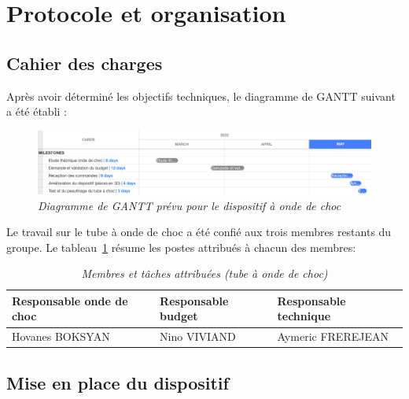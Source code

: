 \section{Protocole et organisation}
\subsection{Cahier des charges}
Après avoir déterminé les objectifs techniques, le diagramme de GANTT suivant a été établi :
\begin{figure}[H]
	\centering
	\includegraphics[scale = 0.4]{figures/gantt_choc.png}
	\caption{\small{\textit{Diagramme de GANTT prévu pour le dispositif à onde de choc}}}
	\label{fig:gantt_choc}
\end{figure}
Le travail sur le tube à onde de choc a été confié aux trois membres restants du groupe. Le tableau~\ref{tab:gestion_choc} résume les postes attribués à chacun des membres:
\begin{table}[H]
	\centering
	\begin{tabular}{|l l l|}
		\hline
		\small\textbf{Responsable onde de choc}&\small\textbf{Responsable budget}&\small\textbf{Responsable technique}\\
		\hline
		\small{Hovanes BOKSYAN}&\small{Nino VIVIAND}&\small{Aymeric FREREJEAN}\\
		\hline
	\end{tabular}
	\caption{\small\textit{Membres et tâches attribuées (tube à onde de choc)}}
	\label{tab:gestion_choc}
\end{table}
\subsection{Mise en place du dispositif}
